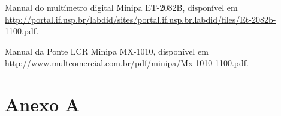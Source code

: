 \documentclass[a4paper]{instrumentacao}
\begin{document}
\begin{thebibliography}{9}
 Manual do multímetro digital Minipa ET-2082B, disponível em \url{http://portal.if.usp.br/labdid/sites/portal.if.usp.br.labdid/files/Et-2082b-1100.pdf}.

 Manual da Ponte LCR Minipa MX-1010, disponível em \url{http://www.multcomercial.com.br/pdf/minipa/Mx-1010-1100.pdf}.



\end{thebibliography}

\chapter*{Anexo A}
\label{ch:anexo-a}








\end{document}
